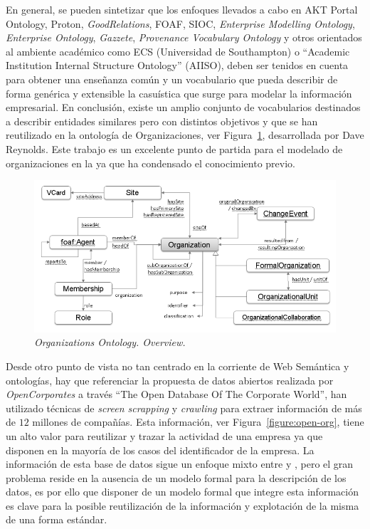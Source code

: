 En general, se pueden sintetizar que los enfoques llevados a cabo en AKT Portal Ontology, Proton,
\textit{GoodRelations}, \gls{FOAF}, \gls{SIOC}, \textit{Enterprise Modelling Ontology}, \textit{Enterprise Ontology}, \textit{Gazzete}, \textit{Provenance Vocabulary Ontology}
y otros orientados al ambiente académico como ECS (Universidad de Southampton) o ``Academic Institution Internal Structure Ontology'' (\gls{AIISO}), 
deben ser tenidos en cuenta para obtener una enseñanza común y un vocabulario que pueda describir de forma genérica
y extensible la casuística que surge para modelar la información empresarial. En conclusión, existe 
un amplio conjunto de vocabularios destinados a describir entidades similares pero con distintos objetivos
y que se han reutilizado en la ontología de Organizaciones, ver Figura~\ref{fig:org-ontology}, desarrollada por Dave Reynolds. Este trabajo
es un excelente punto de partida para el modelado de organizaciones en la \wode ya que ha condensado el conocimiento
previo.

\begin{figure}[h]
 \centering
    \includegraphics[width=14cm]{images/phd/org}
  \caption{\textit{Organizations Ontology. Overview.}}
 \label{fig:org-ontology}
\end{figure}

Desde otro punto de vista no tan centrado en la corriente de Web Semántica y ontologías, hay que referenciar 
la propuesta de datos abiertos realizada por \textit{OpenCorporates} a través ``The Open Database Of The Corporate World'', han utilizado
técnicas de \textit{screen scrapping} y \textit{crawling} para extraer información de más de $12$ millones de compañías. Esta
información, ver Figura~\ref{figure:open-org}, tiene un alto valor para reutilizar y trazar la actividad de una empresa ya que disponen en la mayoría
de los casos del identificador de la empresa. La información de esta base de datos sigue un enfoque mixto entre \opendata y \linkeddata, 
pero el gran problema reside en la ausencia de un modelo formal para la descripción de los datos, es por ello que disponer de un modelo formal 
que integre esta información es clave para la posible reutilización de la información y explotación de la misma de una forma estándar.

